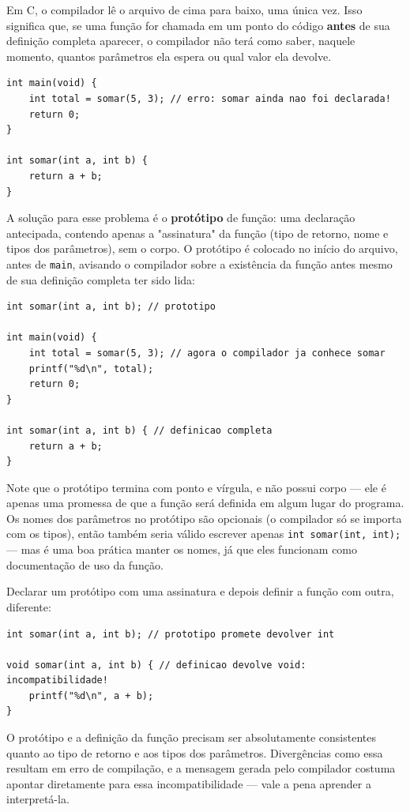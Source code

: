 Em C, o compilador lê o arquivo de cima para baixo, uma única vez. Isso significa que, se uma função for chamada em um ponto do código \textbf{antes} de sua definição completa aparecer, o compilador não terá como saber, naquele momento, quantos parâmetros ela espera ou qual valor ela devolve.

\begin{lstlisting}
int main(void) {
    int total = somar(5, 3); // erro: somar ainda nao foi declarada!
    return 0;
}

int somar(int a, int b) {
    return a + b;
}
\end{lstlisting}

A solução para esse problema é o \textbf{protótipo} de função: uma declaração antecipada, contendo apenas a "assinatura" da função (tipo de retorno, nome e tipos dos parâmetros), sem o corpo. O protótipo é colocado no início do arquivo, antes de \texttt{main}, avisando o compilador sobre a existência da função antes mesmo de sua definição completa ter sido lida:

\begin{lstlisting}
int somar(int a, int b); // prototipo

int main(void) {
    int total = somar(5, 3); // agora o compilador ja conhece somar
    printf("%d\n", total);
    return 0;
}

int somar(int a, int b) { // definicao completa
    return a + b;
}
\end{lstlisting}

Note que o protótipo termina com ponto e vírgula, e não possui corpo — ele é apenas uma promessa de que a função será definida em algum lugar do programa. Os nomes dos parâmetros no protótipo são opcionais (o compilador só se importa com os tipos), então também seria válido escrever apenas \texttt{int somar(int, int);} — mas é uma boa prática manter os nomes, já que eles funcionam como documentação de uso da função.

\begin{errocomum}
Declarar um protótipo com uma assinatura e depois definir a função com outra, diferente:
\begin{lstlisting}
int somar(int a, int b); // prototipo promete devolver int

void somar(int a, int b) { // definicao devolve void: incompatibilidade!
    printf("%d\n", a + b);
}
\end{lstlisting}
O protótipo e a definição da função precisam ser absolutamente consistentes quanto ao tipo de retorno e aos tipos dos parâmetros. Divergências como essa resultam em erro de compilação, e a mensagem gerada pelo compilador costuma apontar diretamente para essa incompatibilidade — vale a pena aprender a interpretá-la.
\end{errocomum}

